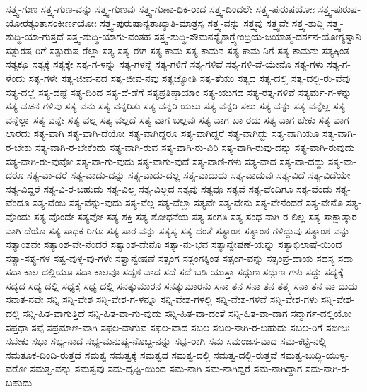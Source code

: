{ಸತ್ತ್ವ-ಗುಣ
ಸತ್ತ್ವ-ಗುಣ-ವನ್ನು
ಸತ್ತ್ವ-ಗುಣವು
ಸತ್ತ್ವ-ಗುಣಾ-ಧಿಕ-ರಾದ
ಸತ್ತ್ವ-ದಿಂದಲೇ
ಸತ್ತ್ವ-ಪುರುಷಯೋಃ
ಸತ್ತ್ವ-ಪುರುಷ-ಯೋರತ್ಯಂತಾಸಂಕೀರ್ಣಯೋಃ
ಸತ್ತ್ವ-ಪುರುಷಾನ್ಯತಾಖ್ಯಾತಿ-ಮಾತ್ರಸ್ಯ
ಸತ್ತ್ವ-ವನ್ನು
ಸತ್ತ್ವವು
ಸತ್ತ್ವವೇ
ಸತ್ತ್ವ-ಶುದ್ಧಿ
ಸತ್ತ್ವ-ಶುದ್ಧಿ-ಯಾ-ಗುತ್ತದೆ
ಸತ್ತ್ವ-ಶುದ್ಧಿ-ಯಾಗು-ವಂತಹ
ಸತ್ತ್ವ-ಶುದ್ಧಿ-ಸೌಮನಸ್ಯೈಕಾಗ್ರ್ಯೇಂದ್ರಿಯ-ಜಯಾತ್ಮ-ದರ್ಶನ-ಯೋಗ್ಯತ್ವಾನಿ
ಸತ್ಪುರಷ-ರಿಗೆ
ಸತ್ಪುರುಷ-ರೆಲ್ಲಾ
ಸತ್ಯ
ಸತ್ಯ-ಈಗ
ಸತ್ಯ-ಕಾಮ
ಸತ್ಯ-ಕಾಮನ
ಸತ್ಯ-ಕಾಮ-ನಿಗೆ
ಸತ್ಯ-ಕಾಮನು
ಸತ್ಯಕ್ಕಿಂತ
ಸತ್ಯಕ್ಕೂ
ಸತ್ಯಕ್ಕೆ
ಸತ್ಯಕ್ಕೇ
ಸತ್ಯ-ಗ-ಳನ್ನು
ಸತ್ಯ-ಗಳನ್ನೆ
ಸತ್ಯ-ಗಳಿಗೆ
ಸತ್ಯ-ಗಳಿವೆ
ಸತ್ಯ-ಗಳಿ-ವೆ-ಯೇನೊ
ಸತ್ಯ-ಗಳು
ಸತ್ಯ-ಗ-ಳೆಂದು
ಸತ್ಯ-ಗಳೇ
ಸತ್ಯ-ಜೀವ-ನದ
ಸತ್ಯ-ಜೀವ-ನವು
ಸತ್ಯಜ್ಯೋತಿ
ಸತ್ಯ-ತೆಯು
ಸತ್ಯದ
ಸತ್ಯ-ದಲ್ಲಿ
ಸತ್ಯ-ದಲ್ಲಿ-ರು-ವೆವು
ಸತ್ಯ-ದಲ್ಲೆ
ಸತ್ಯ-ದಷ್ಟೆ
ಸತ್ಯ-ದಿಂದ
ಸತ್ಯ-ದೆ-ಡೆಗೆ
ಸತ್ಯಪ್ರತಿಷ್ಠಾಯಾಂ
ಸತ್ಯ-ಯುಗದ
ಸತ್ಯ-ರತ್ನ-ಗಳಿವೆ
ಸತ್ಯರ್ಮ-ಗ-ಳನ್ನು
ಸತ್ಯ-ವಚನ-ಗಳಿವು
ಸತ್ಯ-ವನು
ಸತ್ಯ-ವನ್ನರಿತು
ಸತ್ಯ-ವನ್ನರಿ-ಯಲು
ಸತ್ಯ-ವನ್ನರಿ-ಸಲು
ಸತ್ಯ-ವನ್ನು
ಸತ್ಯ-ವನ್ನೆಲ್ಲ
ಸತ್ಯ-ವನ್ನೆಲ್ಲಾ
ಸತ್ಯ-ವನ್ನೇ
ಸತ್ಯ-ವಲ್ಲ
ಸತ್ಯ-ವಲ್ಲದೆ
ಸತ್ಯ-ವಾಗ-ಬಲ್ಲವು
ಸತ್ಯ-ವಾಗ-ಬಾ-ರದು
ಸತ್ಯ-ವಾಗ-ಬೇಕು
ಸತ್ಯ-ವಾಗ-ಲಾರದು
ಸತ್ಯ-ವಾಗಿ
ಸತ್ಯ-ವಾಗಿ-ದೆಯೋ
ಸತ್ಯ-ವಾಗಿದ್ದರೂ
ಸತ್ಯ-ವಾಗಿದ್ದರೆ
ಸತ್ಯ-ವಾಗಿದ್ದು
ಸತ್ಯ-ವಾಗಿಯೂ
ಸತ್ಯ-ವಾಗಿ-ರ-ಬೇಕು
ಸತ್ಯ-ವಾಗಿ-ರ-ಬೇಕೆಂದು
ಸತ್ಯ-ವಾಗಿ-ರುವ
ಸತ್ಯ-ವಾಗಿ-ರು-ವಿರಿ
ಸತ್ಯ-ವಾಗಿ-ರುವು-ದನ್ನು
ಸತ್ಯ-ವಾಗಿ-ರುವುದು
ಸತ್ಯ-ವಾಗಿ-ರು-ವುವೋ
ಸತ್ಯ-ವಾ-ಗು-ವುದು
ಸತ್ಯ-ವಾಗು-ವುದೆ
ಸತ್ಯ-ವಾಣಿ-ಗಳು
ಸತ್ಯ-ವಾದ
ಸತ್ಯ-ವಾ-ದದ್ದು
ಸತ್ಯ-ವಾ-ದರೂ
ಸತ್ಯ-ವಾ-ದರೆ
ಸತ್ಯ-ವಾದು-ದನ್ನು
ಸತ್ಯ-ವಾದು-ದಲ್ಲ
ಸತ್ಯ-ವಾದುದು
ಸತ್ಯ-ವಾದುವು
ಸತ್ಯ-ವಿದೆ
ಸತ್ಯ-ವಿದೆಯೇ
ಸತ್ಯ-ವಿದ್ದರೆ
ಸತ್ಯ-ವಿ-ರ-ಬಹುದು
ಸತ್ಯ-ವಿಲ್ಲ
ಸತ್ಯ-ವಿಲ್ಲದ
ಸತ್ಯವು
ಸತ್ಯವೂ
ಸತ್ಯವೆ
ಸತ್ಯ-ವೆಂದಿಗೂ
ಸತ್ಯ-ವೆಂದು
ಸತ್ಯ-ವೆಂದೂ
ಸತ್ಯ-ವೆಂಬ
ಸತ್ಯ-ವೆನ್ನು-ವುದು
ಸತ್ಯ-ವೆಲ್ಲ
ಸತ್ಯ-ವೆಲ್ಲಾ
ಸತ್ಯವೇ
ಸತ್ಯ-ವೇನು
ಸತ್ಯ-ವೇನೆಂದರೆ
ಸತ್ಯ-ವೇನೊ
ಸತ್ಯ-ವೊಂದು
ಸತ್ಯ-ವೊಂದೇ
ಸತ್ಯವೋ
ಸತ್ಯ-ಶಕ್ತಿ
ಸತ್ಯ-ಶೋಧನೆಯ
ಸತ್ಯ-ಸಂಗತಿ
ಸತ್ಯ-ಸಂಧ-ನಾಗಿ-ರ-ಲಿಲ್ಲ
ಸತ್ಯ-ಸಾಕ್ಷಾತ್ಕಾರ-ವಾಗಿ-ದೆಯೊ
ಸತ್ಯ-ಸಾಧಕ-ರಿಗೂ
ಸತ್ಯ-ಸಾರ-ವನ್ನು
ಸತ್ಯಸ್ಯ-ಸತ್ಯ-ದಂತೆ
ಸತ್ಯಾಂಶ
ಸತ್ಯಾಂಶ-ಗಳಿದ್ದುವು
ಸತ್ಯಾಂಶ-ವನ್ನು
ಸತ್ಯಾಂಶವೇ
ಸತ್ಯಾಂಶ-ವೇ-ನೆಂದರೆ
ಸತ್ಯಾಂಶ-ವೇನೊ
ಸತ್ಯಾ-ನು-ಭವ
ಸತ್ಯಾನ್ವೇಷಣೆ-ಯನ್ನು
ಸತ್ಯಾಭಿಲಾಷೆ-ಯಿಂದ
ಸತ್ಯಾ-ಸತ್ಯ-ಗಳ
ಸತ್ವ-ವುಳ್ಳ-ವು-ಗಳೇ
ಸತ್ವಾನ್ವೇಷಣೆ
ಸತ್ಸಂಗ
ಸತ್ಸಂಗಕ್ಕಿಂತ
ಸತ್ಸಂಗ-ವನ್ನು
ಸತ್ಸಂಪ್ರ-ದಾಯ
ಸದಸ್ಯ
ಸದಾ
ಸದಾ-ಕಾಲ-ದಲ್ಲಿಯೂ
ಸದಾ-ಕಾಲವೂ
ಸದೃಶ-ವಾದ
ಸದೆ
ಸದೆ-ಬಡಿ-ಯುತ್ತಾ
ಸದ್ಗುಣ
ಸದ್ಗುಣ-ಗಳು
ಸದ್ದು
ಸದ್ಯಕ್ಕೆ
ಸದ್ಯದ
ಸದ್ಯ-ದಲ್ಲಿ
ಸಧ್ಯಕ್ಕೆ
ಸಧ್ಯ-ದಲ್ಲಿ
ಸನತ್ಕುಮಾರನ
ಸನತ್ಕುಮಾರನು
ಸನಾ-ತನ
ಸನಾ-ತನ-ತತ್ತ್ವ
ಸನಾ-ತನ-ವಾ-ದುದು
ಸನಾತ-ನವೇ
ಸನ್ನಿ
ಸನ್ನಿ-ವೇಶ
ಸನ್ನಿ-ವೇಶ-ಗ-ಳನ್ನೂ
ಸನ್ನಿ-ವೇಶ-ಗಳಲ್ಲಿ
ಸನ್ನಿ-ವೇಶ-ಗಳಿವೆ
ಸನ್ನಿ-ವೇಶ-ಗಳು
ಸನ್ನಿ-ವೇಶ-ದಲ್ಲಿ
ಸನ್ನಿ-ಹಿತ-ವಾಗುತ್ತಿದೆ
ಸನ್ನಿ-ಹಿತ-ವಾ-ಗು-ವುದು
ಸನ್ನಿ-ಹಿತ-ವಾ-ದಂತೆ
ಸನ್ನಿ-ಹಿತ-ವಾ-ದಾಗ
ಸನ್ಮಾರ್ಗ-ದಲ್ಲಿಯೋ
ಸಪ್ತಧಾ
ಸಪ್ಪೆ
ಸಪ್ರಮಾಣ-ವಾಗಿ
ಸಫಲ-ವಾಗುವ
ಸಫಲ-ವಾದ
ಸಬಲ
ಸಬಲ-ನಾಗಿ-ರ-ಬಹುದು
ಸಬಲ-ರಿಗೆ
ಸಬೀಜಃ
ಸಬೇಕು
ಸಭಾ
ಸಭ್ಯ-ನಾದ
ಸಭ್ಯ-ಮನುಷ್ಯ-ನೊಬ್ಬ-ನನ್ನು
ಸಭ್ಯ-ರಾಗಿ
ಸಮ
ಸಮಂಜಸ-ವಾದ
ಸಮ-ಕಟ್ಟಿ-ನಲ್ಲಿ
ಸಮತೂಕ-ದಿಂದಿ-ರುತ್ತದೆ
ಸಮತ್ವ
ಸಮತ್ವಕ್ಕೆ
ಸಮತ್ವದ
ಸಮತ್ವ-ದಲ್ಲಿ
ಸಮತ್ವ-ದಲ್ಲಿ-ರುತ್ತವೆ
ಸಮತ್ವ-ಬುದ್ಧಿ-ಯುಳ್ಳ-ವರೋ
ಸಮತ್ವ-ವನ್ನು
ಸಮತ್ವವು
ಸಮ-ದೃಷ್ಟಿ-ಯಿಂದ
ಸಮ-ನಾಗಿ
ಸಮ-ನಾಗಿದ್ದರೆ
ಸಮ-ನಾಗಿದ್ದಾಗ
ಸಮ-ನಾಗಿ-ರ-ಬಹುದು
}
